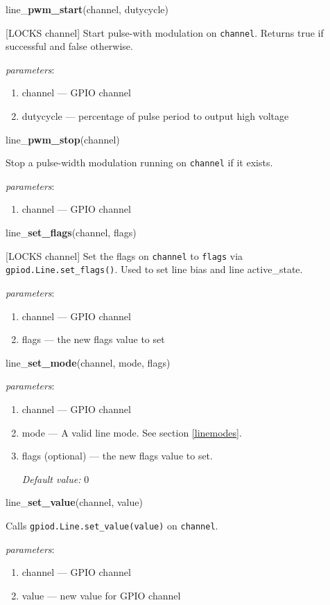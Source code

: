 \documentclass[12pt]{article}
\begin{document}
\noindent line\_\textbf{pwm\_start}(channel, dutycycle)

[LOCKS channel] Start pulse-with modulation on \texttt{channel}.
Returns true if successful and false otherwise.

\textit{parameters}:
\begin{enumerate}      
        \item channel --- GPIO channel
        \item dutycycle --- percentage of pulse period to output high voltage
\end{enumerate}

\noindent line\_\textbf{pwm\_stop}(channel)

Stop a pulse-width modulation running on \texttt{channel} if it exists.

\textit{parameters}:
\begin{enumerate}      
        \item channel --- GPIO channel
\end{enumerate}

\noindent line\_\textbf{set\_flags}(channel, flags)

[LOCKS channel]
Set the flags on \texttt{channel} to \texttt{flags} via \texttt{gpiod.Line.set\_flags()}. Used to set line bias and line active\_state.

\textit{parameters}:
\begin{enumerate}      
        \item channel --- GPIO channel
        \item flags --- the new flags value to set
\end{enumerate}

\noindent line\_\textbf{set\_mode}(channel, mode, flags)

\textit{parameters}:
\begin{enumerate}      
        \item channel --- GPIO channel
        \item mode --- A valid line mode. See section \ref{linemodes}.
        \item flags (optional) --- the new flags value to set.
        
        \textit{Default value:} $0$
\end{enumerate}

\noindent line\_\textbf{set\_value}(channel, value)

Calls \texttt{gpiod.Line.set\_value(value)} on \texttt{channel}.

\textit{parameters}:
\begin{enumerate}      
        \item channel --- GPIO channel
        \item value --- new value for GPIO channel
\end{enumerate}
\end{document}
